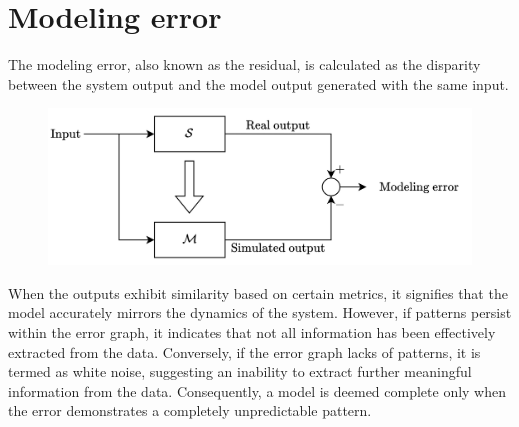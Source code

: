 \section{Modeling error}

The modeling error, also known as the residual, is calculated as the disparity between the system output and the model output generated with the same input.
\begin{figure}[H]
    \centering
    \includegraphics[width=0.7\linewidth]{images/error.png}
\end{figure}
When the outputs exhibit similarity based on certain metrics, it signifies that the model accurately mirrors the dynamics of the system. 
However, if patterns persist within the error graph, it indicates that not all information has been effectively extracted from the data. 
Conversely, if the error graph lacks of patterns, it is termed as white noise, suggesting an inability to extract further meaningful information from the data.
Consequently, a model is deemed complete only when the error demonstrates a completely unpredictable pattern.